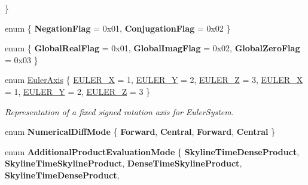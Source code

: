 \begin{DoxyCompactItemize}
 \}
\item 
\mbox{\label{namespace_eigen_ab1c63a0021fe530379c99ab5e02c4a83}} 
enum \{ {\bfseries Negation\+Flag} = 0x01, 
{\bfseries Conjugation\+Flag} = 0x02
 \}
\item 
\mbox{\label{namespace_eigen_a25d33733f2ec165fa4a341ccc74e2968}} 
enum \{ {\bfseries Global\+Real\+Flag} = 0x01, 
{\bfseries Global\+Imag\+Flag} = 0x02, 
{\bfseries Global\+Zero\+Flag} = 0x03
 \}
\item 
enum \hyperlink{namespace_eigen_ae614aa7cdd687fb5c421a54f2ce5c361}{Euler\+Axis} \{ \newline
\hyperlink{namespace_eigen_ae614aa7cdd687fb5c421a54f2ce5c361ae8110af93d433bfcf247d6bac5e1d387}{E\+U\+L\+E\+R\+\_\+X} = 1, 
\hyperlink{namespace_eigen_ae614aa7cdd687fb5c421a54f2ce5c361a7309edb53a9d9cdb77fac7c1e9200263}{E\+U\+L\+E\+R\+\_\+Y} = 2, 
\hyperlink{namespace_eigen_ae614aa7cdd687fb5c421a54f2ce5c361a0c641fd5050b5219d6c172ac83fb379d}{E\+U\+L\+E\+R\+\_\+Z} = 3, 
\hyperlink{namespace_eigen_ae614aa7cdd687fb5c421a54f2ce5c361ae8110af93d433bfcf247d6bac5e1d387}{E\+U\+L\+E\+R\+\_\+X} = 1, 
\newline
\hyperlink{namespace_eigen_ae614aa7cdd687fb5c421a54f2ce5c361a7309edb53a9d9cdb77fac7c1e9200263}{E\+U\+L\+E\+R\+\_\+Y} = 2, 
\hyperlink{namespace_eigen_ae614aa7cdd687fb5c421a54f2ce5c361a0c641fd5050b5219d6c172ac83fb379d}{E\+U\+L\+E\+R\+\_\+Z} = 3
 \}\begin{DoxyCompactList}\small\item\em Representation of a fixed signed rotation axis for Euler\+System. \end{DoxyCompactList}
\item 
\mbox{\label{namespace_eigen_a53f19342e6b4ecd38ae002d470299add}} 
enum {\bfseries Numerical\+Diff\+Mode} \{ {\bfseries Forward}, 
{\bfseries Central}, 
{\bfseries Forward}, 
{\bfseries Central}
 \}
\item 
\mbox{\label{namespace_eigen_a23b8fa1446cf8ebdf8901a0644e8dd42}} 
enum {\bfseries Additional\+Product\+Evaluation\+Mode} \{ \newline
{\bfseries Skyline\+Time\+Dense\+Product}, 
{\bfseries Skyline\+Time\+Skyline\+Product}, 
{\bfseries Dense\+Time\+Skyline\+Product}, 
{\bfseries Skyline\+Time\+Dense\+Product}, 
\newline

\end{DoxyCompactItemize}
